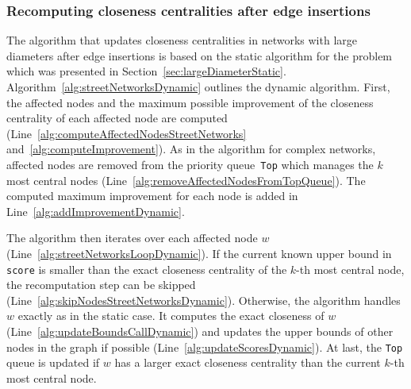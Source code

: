 \subsubsection{Recomputing closeness centralities after edge insertions}
The algorithm that updates closeness centralities in networks with large diameters after edge insertions is based on the static algorithm for the problem which was presented in Section~\ref{sec:largeDiameterStatic}. Algorithm~\ref{alg:streetNetworksDynamic} outlines the dynamic algorithm. First, the affected nodes and the maximum possible improvement of the closeness centrality of each affected node are computed (Line~\ref{alg:computeAffectedNodesStreetNetworks} and~\ref{alg:computeImprovement}). As in the algorithm for complex networks, affected nodes are removed from the priority queue \texttt{Top} which manages the $k$ most central nodes (Line~\ref{alg:removeAffectedNodesFromTopQueue}). The computed maximum improvement for each node is added in Line~\ref{alg:addImprovementDynamic}.

The algorithm then iterates over each affected node $w$ (Line~\ref{alg:streetNetworksLoopDynamic}). If the current known upper bound in \texttt{score} is smaller than the exact closeness centrality of the $k$-th most central node, the recomputation step can be skipped (Line~\ref{alg:skipNodesStreetNetworksDynamic}). Otherwise, the algorithm handles $w$ exactly as in the static case. It computes the exact closeness of $w$ (Line~\ref{alg:updateBoundsCallDynamic}) and updates the upper bounds of other nodes in the graph if possible (Line~\ref{alg:updateScoresDynamic}). At last, the \texttt{Top} queue is updated if $w$ has a larger exact closeness centrality than the current $k$-th most central node.

